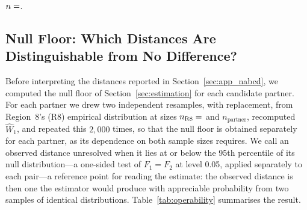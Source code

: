 \documentclass[AMA,Times1COL]{WileyNJDv5}
\begin{document}
\begin{table}[ht]
\centering
\caption{Region~8 baseline characteristics (GUSTO-I).\label{tab:gusto_r8}}
\begin{tablenotes}
\item $n = \numval{nR8note}$.
\end{tablenotes}
\end{table}

\subsection{Null Floor: Which Distances Are Distinguishable from No Difference?}\label{sec:app_operability}

Before interpreting the distances reported in Section~\ref{sec:app_nabcd}, we computed the null floor of Section~\ref{sec:estimation} for each candidate partner. For each partner we drew two independent resamples, with replacement, from Region~8's (R8) empirical distribution at sizes $n_{\text{R8}} = \numval{nR8floor}$ and $n_{\text{partner}}$, recomputed $\widehat{W}_1$, and repeated this $2{,}000$ times, so that the null floor is obtained separately for each partner, as its dependence on both sample sizes requires. We call an observed distance unresolved when it lies at or below the 95th percentile of its null distribution---a one-sided test of $F_1 = F_2$ at level 0.05, applied separately to each pair---a reference point for reading the estimate: the observed distance is then one the estimator would produce with appreciable probability from two samples of identical distributions. Table~\ref{tab:operability} summarises the result.

\begin{table}[ht]
\centering
\caption{Null floor of $\widehat{W}_1$ across the 15 candidate partners, by effect modifier. Ranges are across partners; the floor depends on each partner's sample size. Unresolved distances are those whose observed $\widehat{W}_1$ falls at or below the 95th percentile of the null distribution.\label{tab:operability}}
\end{table}
\end{document}
